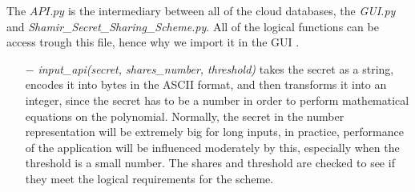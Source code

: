 \documentclass[12pt, a4paper, oneside]{book}
\begin{document}
    The $API.py$ is the intermediary between all of the cloud databases, the {\it GUI.py} and {\it Shamir\_Secret\_Sharing\_Scheme.py}. All of the logical functions can be access trough this file, hence why we import it in the GUI .
    \vspace{-0.5cm}
    \begin{itemize}
        \item[$-$] {\it input\_api(secret, shares\_number, threshold)} takes the secret as a string, encodes it into bytes in the ASCII format, and then transforms it into an integer, since the secret has to be a number in order to perform mathematical equations on the polynomial. Normally, the secret in the number representation will be extremely big for long inputs, in practice, performance of the application will be influenced moderately by this, especially when the threshold is a small number. The shares and threshold are checked to see if they meet the logical requirements for the scheme.
    \end{itemize}
    \vspace{-0.5cm}
\end{document}
